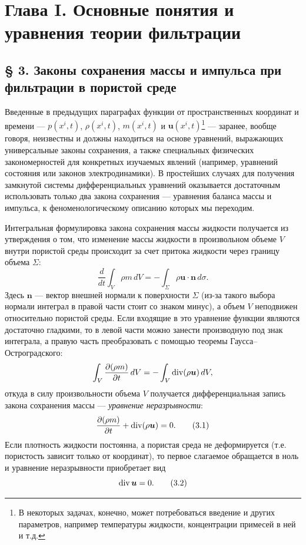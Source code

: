 \section*{Глава I. Основные понятия и уравнения теории фильтрации}
\subsection*{§ 3. Законы сохранения массы и импульса при фильтрации в пористой среде}
\label{q3:sec-3}
\setcounter{footnote}{0}
Введенные в предыдущих параграфах функции от пространственных координат и времени --- $p(x^i,t)$, $\rho(x^i,t)$, $m(x^i,t)$ и $\boldsymbol{u}(x^i,t)$\footnote{В некоторых задачах, конечно, может потребоваться введение и других параметров, например температуры жидкости, концентрации примесей в ней и т.д.} --- заранее, вообще говоря, неизвестны и должны находиться на основе уравнений, выражающих универсальные законы сохранения, а также специальных физических закономерностей для конкретных изучаемых явлений (например, уравнений состояния или законов электродинамики). В простейших случаях
для получения замкнутой системы дифференциальных уравнений оказывается достаточным использовать только два закона сохранения --- уравнения баланса массы и импульса, к феноменологическому описанию которых мы переходим.

Интегральная формулировка закона сохранения массы жидкости получается из утверждения о том, что изменение массы жидкости в произвольном объеме $V$ внутри пористой среды происходит за счет притока жидкости через границу объема $\Sigma$:
\[
\frac{d}{dt}\int_V\rho m\,dV=-\int_\Sigma\rho\boldsymbol{u}\cdot\boldsymbol{n}\,d\sigma.
\]
Здесь $\boldsymbol{n}$ --- вектор внешней нормали к поверхности $\Sigma$ (из-за такого выбора нормали интеграл в правой части стоит со знаком минус), а объем $V$ неподвижен относительно пористой среды. Если входящие в это уравнение функции являются достаточно гладкими, то в левой части можно занести производную под знак интеграла, а правую часть преобразовать с помощью теоремы Гаусса--Остроградского:
\[
\int_V\frac{\partial(\rho m)}{\partial t}\,dV=-\int_V\operatorname{div}(\rho\boldsymbol{u})\,dV,
\]
откуда в силу произвольности объема $V$ получается дифференциальная запись закона сохранения массы --- \textit{уравнение неразрывности}:
\begin{equation}
\frac{\partial(\rho m)}{\partial t}+\operatorname{div}(\rho\boldsymbol{u})=0.
\tag{3.1}\label{q3:eq-3-1}
\end{equation}
Если плотность жидкости постоянна, а пористая среда не деформируется (т.е. пористость зависит только от координат), то первое слагаемое обращается в ноль и уравнение неразрывности приобретает вид
\begin{equation}
\operatorname{div}\boldsymbol{u}=0.
\tag{3.2}\label{q3:eq-3-2}
\end{equation}

